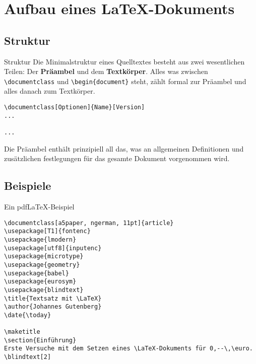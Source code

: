 \section{Aufbau eines \LaTeX{}-Dokuments}

\subsection{Struktur}

\begin{frame}[fragile]{Struktur}
	Die Minimalstruktur eines Quelltextes besteht aus zwei wesentlichen Teilen: Der \textbf{Präambel} und dem \textbf{Textkörper}. Alles was zwischen \texttt{\textbackslash documentclass} und \texttt{\textbackslash begin\{document\}} steht, zählt formal zur Präambel und alles danach zum Textkörper. 	
\begin{lstlisting}[style=tex]
\documentclass[Optionen]{Name}[Version] 
...

...

\end{lstlisting}
Die Präambel enthält prinzipiell all das, was an allgemeinen Definitionen und zusätzlichen festlegungen für das gesamte Dokument vorgenommen wird.	
\end{frame}

\subsection{Beispiele}

\begin{frame}[fragile]{Ein pdf\LaTeX{}-Beispiel}
\begin{lstlisting}[style=tex]
%% Ein pdflatex-Beispiel
\documentclass[a5paper, ngerman, 11pt]{article}
\usepackage[T1]{fontenc}
\usepackage{lmodern}
\usepackage[utf8]{inputenc}
\usepackage{microtype}
\usepackage{geometry}
\usepackage{babel}
\usepackage{eurosym}
\usepackage{blindtext}
\title{Textsatz mit \LaTeX}
\author{Johannes Gutenberg}
\date{\today}

\maketitle
\section{Einführung}
Erste Versuche mit dem Setzen eines \LaTeX-Dokuments für 0,--\,\euro.
\blindtext[2]

\end{lstlisting}
\end{frame}

